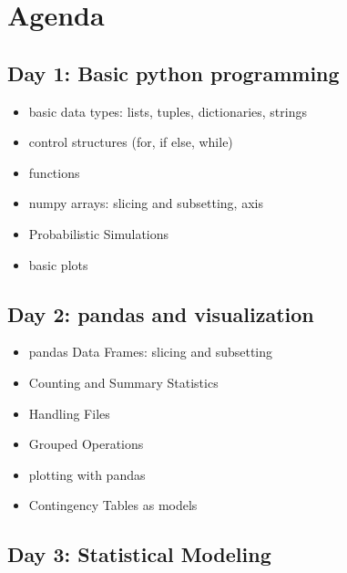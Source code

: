 \documentclass[
  letterpaper,
  DIV=11,
  numbers=noendperiod]{scrreprt}
\providecommand{\tightlist}{%
  \setlength{\itemsep}{0pt}\setlength{\parskip}{0pt}}\usepackage{longtable,booktabs,array}
\begin{document}
\hypertarget{agenda}{%
\section*{Agenda}\label{agenda}}

\hypertarget{day-1-basic-python-programming}{%
\subsection*{Day 1: Basic python
programming}\label{day-1-basic-python-programming}}

\begin{itemize}
\tightlist
\item
  basic data types: lists, tuples, dictionaries, strings
\item
  control structures (for, if else, while)
\item
  functions
\item
  numpy arrays: slicing and subsetting, axis
\item
  Probabilistic Simulations
\item
  basic plots
\end{itemize}

\hypertarget{day-2-pandas-and-visualization}{%
\subsection*{Day 2: pandas and
visualization}\label{day-2-pandas-and-visualization}}

\begin{itemize}
\tightlist
\item
  pandas Data Frames: slicing and subsetting
\item
  Counting and Summary Statistics
\item
  Handling Files
\item
  Grouped Operations
\item
  plotting with pandas
\item
  Contingency Tables as models
\end{itemize}

\hypertarget{day-3-statistical-modeling}{%
\subsection*{Day 3: Statistical
Modeling}\label{day-3-statistical-modeling}}
\end{document}
